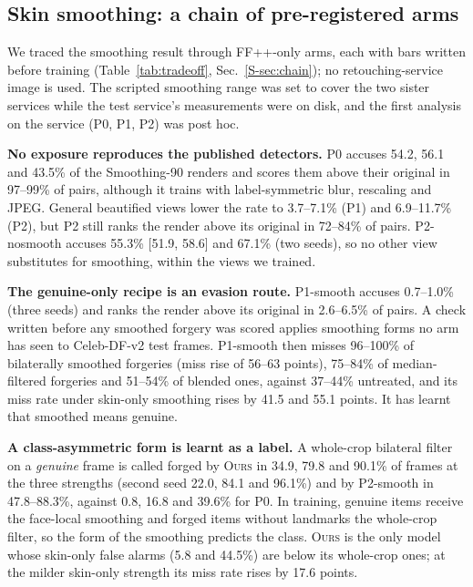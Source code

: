 \documentclass[conference]{IEEEtran}
\newcommand{\ours}{\textsc{Ours}}
\begin{document}
\subsection{Skin smoothing: a chain of pre-registered arms}
\label{sec:chain}
We traced the smoothing result through FF++-only arms, each with bars written before training (Table~\ref{tab:tradeoff},
Sec.~\ref{S-sec:chain}); no retouching-service image is used. The scripted smoothing range was set to cover the two sister
services while the test service's measurements were on disk, and the first analysis on the service (P0, P1, P2) was post hoc.

\textbf{No exposure reproduces the published detectors.} P0 accuses 54.2, 56.1 and 43.5\% of the Smoothing-90 renders and
scores them above their original in 97--99\% of pairs, although it trains with label-symmetric blur, rescaling and JPEG.
General beautified views lower the rate to 3.7--7.1\% (P1) and 6.9--11.7\% (P2), but P2 still ranks the render above its
original in 72--84\% of pairs. P2-nosmooth accuses 55.3\% [51.9, 58.6] and 67.1\% (two seeds), so no other view substitutes for
smoothing, within the views we trained.

\textbf{The genuine-only recipe is an evasion route.} P1-smooth accuses 0.7--1.0\% (three seeds) and ranks the render above
its original in 2.6--6.5\% of pairs. A check written before any smoothed forgery was scored applies smoothing forms no arm has
seen to Celeb-DF-v2 test frames. P1-smooth then misses 96--100\% of bilaterally smoothed forgeries (miss rise of 56--63 points),
75--84\% of median-filtered forgeries and 51--54\% of blended ones, against 37--44\% untreated, and its miss rate under skin-only
smoothing rises by 41.5 and 55.1 points. It has learnt that smoothed means genuine.

\textbf{A class-asymmetric form is learnt as a label.} A whole-crop bilateral filter on a \emph{genuine} frame is called forged
by \ours{} in 34.9, 79.8 and 90.1\% of frames at the three strengths (second seed 22.0, 84.1 and 96.1\%) and by P2-smooth in
47.8--88.3\%, against 0.8, 16.8 and 39.6\% for P0. In training, genuine items receive the face-local smoothing and forged items
without landmarks the whole-crop filter, so the form of the smoothing predicts the class. \ours{} is the only model whose skin-only
false alarms (5.8 and 44.5\%) are below its whole-crop ones; at the milder skin-only strength its miss rate rises by 17.6 points.
\end{document}
